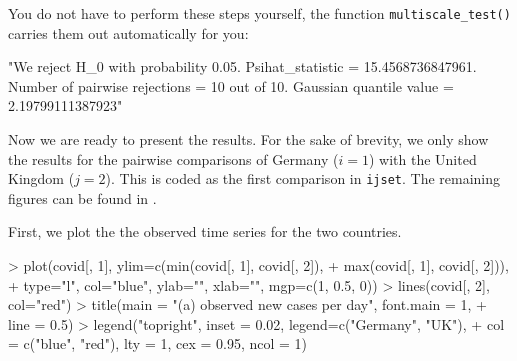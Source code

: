 \documentclass[a4paper]{scrartcl}
\begin{document}
You do not have to perform these steps yourself, the function \verb|multiscale_test()| carries them out automatically for you:

\begin{Schunk}
\begin{Soutput}
[1] "We reject H_0 with probability 0.05. Psihat_statistic = 15.4568736847961. Number of pairwise rejections = 10 out of 10. Gaussian quantile value = 2.19799111387923"
\end{Soutput}
\end{Schunk}

Now we are ready to present the results. For the sake of brevity, we only show the results for the pairwise comparisons of Germany ($i = 1$) with the United Kingdom ($j = 2$). This is coded as the first comparison in \verb|ijset|. The remaining figures can be found in \cite{KhismatullinaVogt2023}.

First, we plot the the observed time series for the two countries.

\begin{Schunk}
\begin{Sinput}
> plot(covid[, 1], ylim=c(min(covid[, 1], covid[, 2]),
+                         max(covid[, 1], covid[, 2])),
+      type="l", col="blue", ylab="", xlab="", mgp=c(1, 0.5, 0))
> lines(covid[, 2], col="red")
> title(main = "(a) observed new cases per day", font.main = 1,
+       line = 0.5)
> legend("topright", inset = 0.02, legend=c("Germany", "UK"),
+        col = c("blue", "red"), lty = 1, cex = 0.95, ncol = 1)
\end{Sinput}
\end{Schunk}
\end{document}
